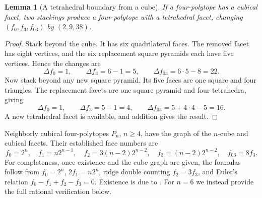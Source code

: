 \documentclass[11pt,a4paper]{article}
\newtheorem{lemma}[theorem]{Lemma}
\theoremstyle{definition}\newtheorem{definition}[theorem]{Definition}
\theoremstyle{remark}\newtheorem{remark}[theorem]{Remark}
\begin{document}
\begin{lemma}[A tetrahedral boundary from a cube]\label{lem:port}
If a four-polytope has a cubical facet, two stackings produce a four-polytope with a tetrahedral facet, changing \((f_0,f_3,f_{03})\) by \((2,9,38)\).
\end{lemma}
\begin{proof}
Stack beyond the cube. It has six quadrilateral faces. The removed facet has eight vertices, and the six replacement square pyramids each have five vertices. Hence the changes are
\[
 \Delta f_0=1,\qquad \Delta f_3=6-1=5,\qquad
 \Delta f_{03}=6\cdot5-8=22.
\]
Now stack beyond any new square pyramid. Its five faces are one square and four triangles. The replacement facets are one square pyramid and four tetrahedra, giving
\[
 \Delta f_0=1,\qquad \Delta f_3=5-1=4,\qquad
 \Delta f_{03}=5+4\cdot4-5=16.
\]
A new tetrahedral facet is available, and addition gives the result.
\end{proof}

Neighborly cubical four-polytopes \(P_n\), \(n\ge4\), have the graph of the \(n\)-cube and cubical facets. Their established face numbers are
\begin{equation}\label{eq:ncp}
 f_0=2^n,\quad f_1=n2^{n-1},\quad
 f_2=3(n-2)2^{n-2},\quad f_3=(n-2)2^{n-2},\quad f_{03}=8f_3.
\end{equation}
For completeness, once existence and the cube graph are given, the formulas follow from \(f_0=2^n\), \(2f_1=n2^n\), ridge double counting \(f_2=3f_3\), and Euler's relation \(f_0-f_1+f_2-f_3=0\). Existence is due to \citet{JZ}. For \(n=6\) we instead provide the full rational verification below.
\end{document}
